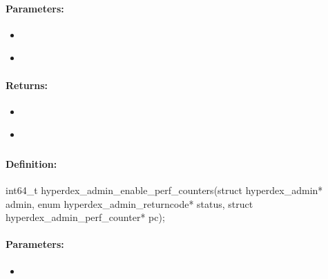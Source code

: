 \paragraph{Parameters:}
\begin{itemize}[noitemsep]
\item {}\\

\item {}\\

\end{itemize}

\paragraph{Returns:}
\begin{itemize}[noitemsep]
\item {}\\

\item {}\\

\end{itemize}

\pagebreak
\subsubsection{}
\label{api:c:enable_perf_counters}


\paragraph{Definition:}
\begin{ccode}
int64_t hyperdex_admin_enable_perf_counters(struct hyperdex_admin* admin,
        enum hyperdex_admin_returncode* status,
        struct hyperdex_admin_perf_counter* pc);
\end{ccode}

\paragraph{Parameters:}
\begin{itemize}[noitemsep]
\item {}\\

\end{itemize}

